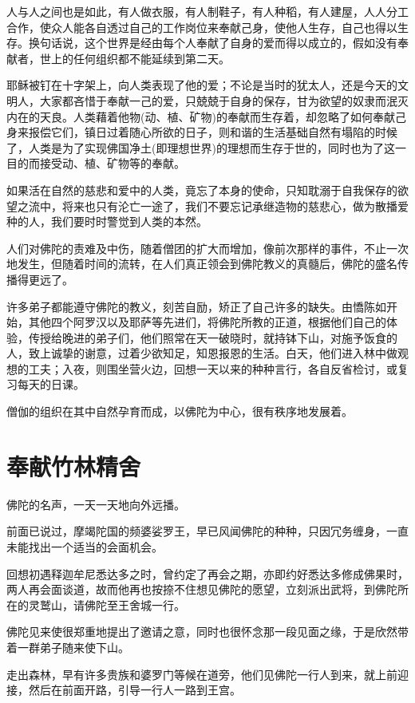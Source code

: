 \documentclass[twoside,openany]{book}
\begin{document}
人与人之间也是如此，有人做衣服，有人制鞋子，有人种稻，有人建屋，人人分工合作，使众人能各自透过自己的工作岗位来奉献己身，使他人生存，自己也得以生存。换句话说，这个世界是经由每个人奉献了自身的爱而得以成立的，假如没有奉献者，世上的任何组织都不能延续到第二天。

耶稣被钉在十字架上，向人类表现了他的爱；不论是当时的犹太人，还是今天的文明人，大家都吝惜于奉献一己的爱，只兢兢于自身的保存，甘为欲望的奴隶而泯灭内在的天良。人类藉着他物(动、植、矿物)的奉献而生存着，却忽略了如何奉献己身来报偿它们，镇日过着随心所欲的日子，则和谐的生活基础自然有塌陷的时候了，人类是为了实现佛国净土(即理想世界)的理想而生存于世的，同时也为了这一目的而接受动、植、矿物等的奉献。

如果活在自然的慈悲和爱中的人类，竟忘了本身的使命，只知耽溺于自我保存的欲望之流中，将来也只有沦亡一途了，我们不要忘记承继造物的慈悲心，做为散播爱种的人，我们要时时警觉到人类的本然。

人们对佛陀的责难及中伤，随着僧团的扩大而增加，像前次那样的事件，不止一次地发生，但随着时间的流转，在人们真正领会到佛陀教义的真髓后，佛陀的盛名传播得更远了。

许多弟子都能遵守佛陀的教义，刻苦自励，矫正了自己许多的缺失。由憍陈如开始，其他四个阿罗汉以及耶萨等先进们，将佛陀所教的正道，根据他们自己的体验，传授给晚进的弟子们，他们照常在天一破晓时，就持钵下山，对施予饭食的人，致上诚挚的谢意，过着少欲知足，知恩报恩的生活。白天，他们进入林中做观想的工夫；入夜，则围坐营火边，回想一天以来的种种言行，各自反省检讨，或复习每天的日课。

僧伽的组织在其中自然孕育而成，以佛陀为中心，很有秩序地发展着。

\section{奉献竹林精舍}\label{sec3.11}

佛陀的名声，一天一天地向外远播。

前面已说过，摩竭陀国的频婆娑罗王，早已风闻佛陀的种种，只因冗务缠身，一直未能找出一个适当的会面机会。

回想初遇释迦牟尼悉达多之时，曾约定了再会之期，亦即约好悉达多修成佛果时，两人再会面谈道，故而他再也按捺不住想见佛陀的愿望，立刻派出武将，到佛陀所在的灵鹫山，请佛陀至王舍城一行。

佛陀见来使很郑重地提出了邀请之意，同时也很怀念那一段见面之缘，于是欣然带着一群弟子随来使下山。

走出森林，早有许多贵族和婆罗门等候在道旁，他们见佛陀一行人到来，就上前迎接，然后在前面开路，引导一行人一路到王宫。
\end{document}
